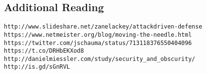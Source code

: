 \documentclass[xga]{xdvislides}
\begin{document}
\subsection{Additional Reading}
\begin{verbatim}
http://www.slideshare.net/zanelackey/attackdriven-defense
https://www.netmeister.org/blog/moving-the-needle.html
https://twitter.com/jschauma/status/713118376550404096
https://t.co/DRHbEKXod8
http://danielmiessler.com/study/security_and_obscurity/
http://is.gd/sGnRVL
\end{verbatim}
\end{document}
